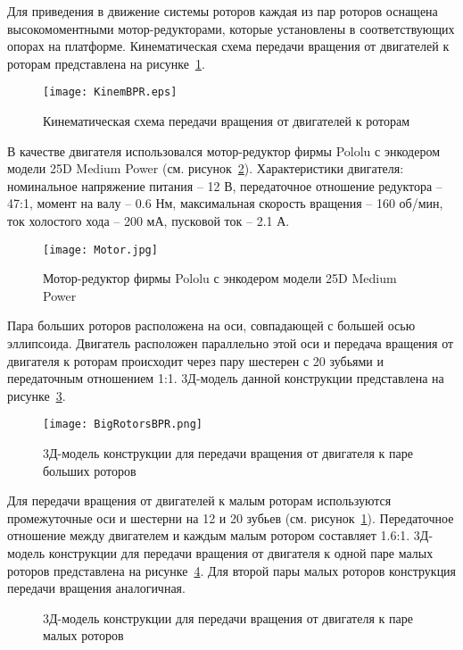 Для приведения в движение системы роторов каждая из пар роторов оснащена высокомоментными мотор-редукторами, которые установлены в соответствующих опорах на платформе. Кинематическая схема передачи вращения от двигателей к роторам представлена на рисунке~\ref{KinemBPR}.

\begin{figure}[h]
	\centering
	\texttt{[image: KinemBPR.eps]}%
	\caption{Кинематическая схема передачи вращения от двигателей к роторам}
	\label{KinemBPR}
\end{figure}

В качестве двигателя использовался мотор-редуктор фирмы Pololu с энкодером модели 25D Medium Power (см. рисунок~\ref{MotorBPR}). Характеристики двигателя: номинальное напряжение питания -- 12 В, передаточное отношение редуктора -- 47:1, момент на валу -- 0.6 Нм, максимальная скорость вращения -- 160 об/мин, ток холостого хода -- 200 мА, пусковой ток -- 2.1 А. 

\begin{figure}[h]
	\centering
	\texttt{[image: Motor.jpg]}%
	\caption{Мотор-редуктор фирмы Pololu с энкодером модели 25D Medium Power}
	\label{MotorBPR}
\end{figure}





Пара больших роторов расположена на оси, совпадающей с большей осью эллипсоида. Двигатель расположен параллельно этой оси и передача вращения от двигателя к роторам происходит через пару шестерен с 20 зубьями и передаточным отношением 1:1. 3Д-модель данной конструкции представлена на рисунке~\ref{BigRotorsBPR}.

\begin{figure}[h]
	\centering
	\texttt{[image: BigRotorsBPR.png]}%
	\caption{3Д-модель конструкции для передачи вращения от двигателя к паре больших роторов}
	\label{BigRotorsBPR}
\end{figure}

Для передачи вращения от двигателей к малым роторам используются промежуточные оси и шестерни на 12 и 20 зубьев (см. рисунок~\ref{KinemBPR}). Передаточное отношение между двигателем и каждым малым ротором составляет 1.6:1. 3Д-модель конструкции для передачи вращения от двигателя к одной паре малых роторов представлена на рисунке~\ref{SmallRotorsBPR}. Для второй пары малых роторов конструкция передачи вращения аналогичная.

\begin{figure}[!ht]
	\begin{minipage}[h]{0.5\linewidth}
	\end{minipage}
	\hfill
	\begin{minipage}[h]{0.5\linewidth}
	\end{minipage}
	\caption{3Д-модель конструкции для передачи вращения от двигателя к паре малых роторов}
	\label{SmallRotorsBPR}
\end{figure}

